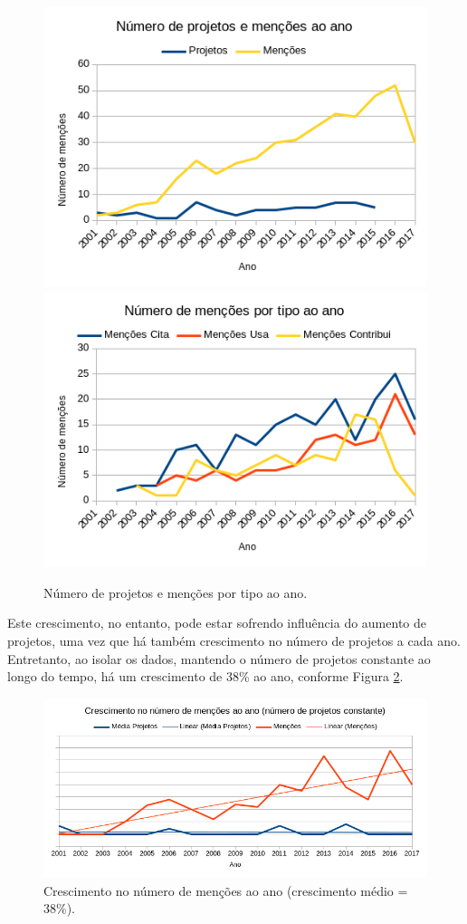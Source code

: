 \begin{figure}[ht]
  \centering
  \includegraphics[scale=0.6]{imagens/mentions-projects-by-year.png}
  \includegraphics[scale=0.6]{imagens/mentions-type-by-year.png}
  \caption{Número de projetos e menções por tipo ao ano.}
  \label{mentions-by-year}
\end{figure}

Este crescimento, no entanto, pode estar sofrendo influência do aumento de
projetos, uma vez que há também crescimento no número de projetos a cada ano.
Entretanto, ao isolar os dados, mantendo o número de projetos constante ao longo
do tempo, há um crescimento de 38\% ao ano, conforme Figura
\ref{mentions-trend}.

\begin{figure}[ht]
  \center
  \includegraphics[scale=0.6]{imagens/mentions-trend.png}
  \caption{Crescimento no número de menções ao ano (crescimento médio = 38\%).}
  \label{mentions-trend}
\end{figure}

